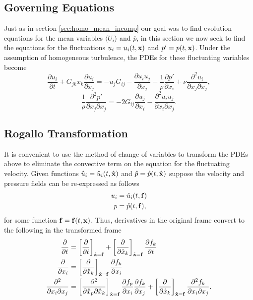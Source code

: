 \documentclass[oneside,a4paper,11pt]{report}
\newcommand{\pavg}{\overline{p}}
\newcommand{\pfluc}{p'}
\newcommand{\uiavg}{\langle U_i \rangle}
\newcommand{\uifluc}{u_i}
\newcommand{\ujfluc}{u_j}
\begin{document}
\subsection{Governing Equations}
Just as in section \ref{sec:homo_mean_incomp} our goal was to find evolution equations for the mean variables $\uiavg$ and $\pavg$, in this section we now seek to find the equations for the fluctuations $\uifluc = \uifluc(t,\xvec)$ and $\pfluc= p(t,\xvec)$. Under the assumption of homogeneous turbulence, the PDEs for these fluctuating variables become 
\begin{equation}
\label{fluc_u_homo}
\frac{\partial \uifluc}{\partial t} + G_{jk} x_k \frac{\partial \uifluc}{\partial x_j} = -\ujfluc G_{ij} - \frac{\partial \uifluc \ujfluc}{\partial x_j} - \frac{1}{\rho} \frac{\partial \pfluc}{\partial x_i} + \nu \frac{\partial^2 \uifluc}{\partial x_j \partial x_j},
\end{equation}
\begin{equation}
\label{fluc_p_homo}
\frac{1}{\rho} \frac{\partial^2 \pfluc}{\partial x_j \partial x_j} = -2 G_{ij} \frac{\partial \ujfluc}{\partial x_i} - \frac{\partial^2 \uifluc \ujfluc}{\partial x_i \partial x_j}.
\end{equation}

\subsection{Rogallo Transformation}
It is convenient to use the method of change of variables to transform the PDEs above to eliminate the convective term on the equation for the fluctuating velocity. Given functions $\mathring{u}_i = \mathring{u}_i(t,\mathring{\mathbf{x}})$ and $\mathring{p} = \mathring{p}(t,\mathring{\mathbf{x}})$ suppose the velocity and pressure fields can be re-expressed as follows
\begin{align}
\uifluc &= \urog_i(t,\fvec) \\
p &= \prog(t,\fvec),
\end{align}
for some function $\mathbf{f} = \bold{f}(t,\mathbf{x})$. Thus, derivatives in the original frame convert to the following in the transformed frame
\begin{align}
    \frac{\partial }{\partial t} &= \left [ \frac{\partial }{\partial t } \right ]_{\mathring{\mathbf{x}} = \bold{f}} + \left [ \frac{\partial }{\partial \mathring{x}_k}\right ]_{\mathring{\mathbf{x}} = \mathbf{f}} \frac{\partial f_k }{\partial t} \\
    \frac{\partial }{\partial x_i} &= \left [ \frac{\partial }{\partial \mathring{x}_k} \right ]_{\mathring{\mathbf{x}} = \mathbf{f}} \frac{\partial f_k}{\partial x_i} \\
    \frac{\partial^2 }{\partial x_i \partial x_j} &= \left [ \frac{\partial^2 }{\partial \mathring{x}_p \partial \mathring{x}_k} \right ]_{\mathring{\mathbf{x}} = \mathbf{f}} \frac{\partial f_p}{\partial x_i} \frac{\partial f_k}{\partial x_j} + \left [ \frac{\partial  }{\partial \mathring{x}_k} \right]_{\mathring{\mathbf{x}} = \mathbf{f} } \frac{\partial^2 f_k }{\partial x_i \partial x_j} .
\end{align}
\end{document}
